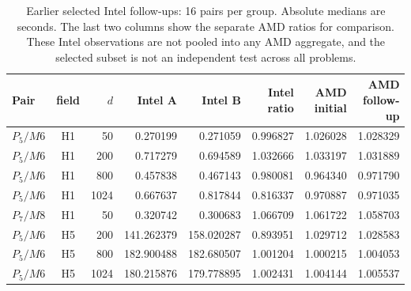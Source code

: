 \begin{table}[htbp]
\centering\scriptsize
\setlength{\tabcolsep}{3pt}
\caption{Earlier selected Intel follow-ups: 16 pairs per group. Absolute medians are seconds. The last two columns show the separate AMD ratios for comparison. These Intel observations are not pooled into any AMD aggregate, and the selected subset is not an independent test across all problems.}\label{tab:ext-intel-followups}
\begin{tabular}{lcrrrrrr}\toprule
Pair & field & $d$ & Intel A & Intel B & Intel ratio & AMD initial & AMD follow-up\\\midrule
$P_{5}/M6$ & H1 & 50 & 0.270199 & 0.271059 & 0.996827 & 1.026028 & 1.028329\\
$P_{5}/M6$ & H1 & 200 & 0.717279 & 0.694589 & 1.032666 & 1.033197 & 1.031889\\
$P_{5}/M6$ & H1 & 800 & 0.457838 & 0.467143 & 0.980081 & 0.964340 & 0.971790\\
$P_{5}/M6$ & H1 & 1024 & 0.667637 & 0.817844 & 0.816337 & 0.970887 & 0.971035\\
$P_{7}/M8$ & H1 & 50 & 0.320742 & 0.300683 & 1.066709 & 1.061722 & 1.058703\\
$P_{5}/M6$ & H5 & 200 & 141.262379 & 158.020287 & 0.893951 & 1.029712 & 1.028583\\
$P_{5}/M6$ & H5 & 800 & 182.900488 & 182.680507 & 1.001204 & 1.000215 & 1.004053\\
$P_{5}/M6$ & H5 & 1024 & 180.215876 & 179.778895 & 1.002431 & 1.004144 & 1.005537\\
\bottomrule\end{tabular}
\end{table}
\FloatBarrier
